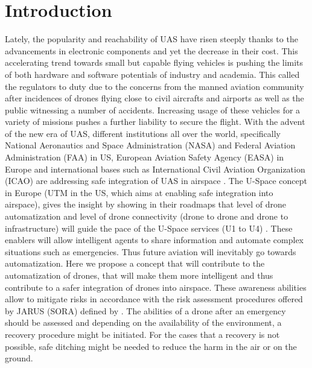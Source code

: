 
\chapter{Introduction}


Lately, the popularity and reachability of UAS have risen steeply thanks to the advancements in electronic components and yet the decrease in their cost. 
This accelerating trend towards small but capable flying vehicles is pushing the limits of both hardware and software potentials of industry and academia. 
This called the regulators to duty due to the concerns from the manned aviation community after incidences of drones flying close to civil aircrafts and airports as well as the public witnessing a number of accidents. 
Increasing usage of these vehicles for a variety of missions pushes a further liability to secure the flight.
With the advent of the new era of UAS, different institutions all over the world, specifically National Aeronautics and Space Administration (NASA) 
\cite{kopardekarunmanned} and Federal Aviation Administration (FAA) \cite{FAA_UASintegration} in US, European Aviation Safety Agency (EASA) \cite{A_NPA_EASA2015} in Europe and international bases such as International Civil Aviation Organization (ICAO) \cite{ICAO_Circular} are addressing safe integration of UAS in airspace \cite{baskaya2016flexible}.
The U-Space concept in Europe (UTM in the US, which aims at enabling safe integration into airspace), gives the insight by showing in their roadmaps that level of drone automatization and level of drone connectivity (drone to drone and drone to infrastructure) will guide the pace of the U-Space services (U1 to U4) \cite{undertaking2017u}. 
These enablers will allow intelligent agents to share information and automate complex situations such as emergencies. 
Thus future aviation will inevitably go towards automatization. 
Here we propose a concept that will contribute to the automatization of drones, that will make them more intelligent and thus contribute to a safer integration of drones into airspace. 
These awareness abilities allow to mitigate risks in accordance with the risk assessment procedures offered by JARUS (SORA) \cite{SORA} defined by \cite{EASAopinion2018}. 
The abilities of a drone after an emergency should be assessed and depending on the availability of the environment, a recovery procedure might be initiated. 
For the cases that a recovery is not possible, safe ditching might be needed to reduce the harm in the air or on the ground. 
 

